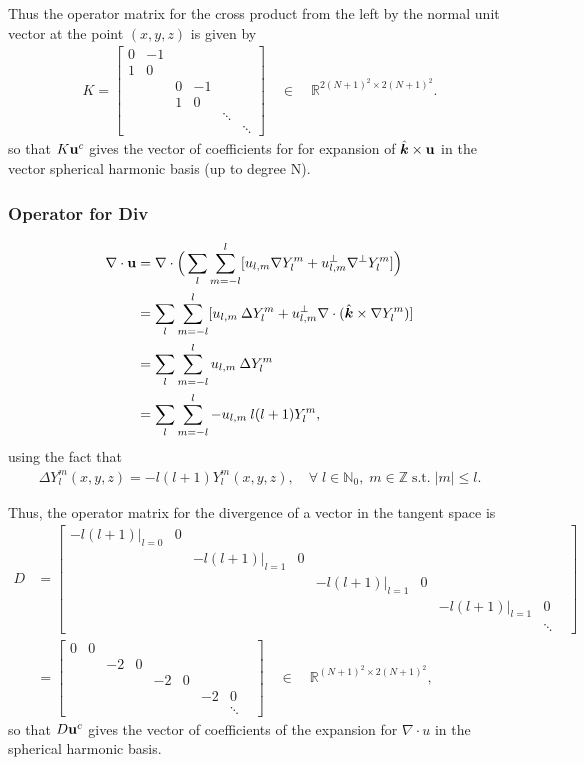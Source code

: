 \documentclass[11pt, oneside]{article}   	%
\newcommand{\R}{\mathbb{R}}
\newcommand{\Z}{\mathbb{Z}}
\newcommand{\No}{\mathbb{N}_0}
\newcommand{\Ylm}{Y^m_l}
\newcommand{\gradYlm}{\nabla Y^m_l}
\newcommand{\gradpYlm}{\nabla^\perp Y^m_l}
\newcommand{\unitvec}{\hat{\bm{k}}}
\begin{document}
Thus the operator matrix for the cross product from the left by the normal unit vector at the point \((x,y,z)\) is given by
\begin{align}
K =  \begin{bmatrix}
		0 & -1 & & & & \\
		1 & 0 & & & & \\
		& & 0 & -1 & & \\
		& & 1 & 0 & & \\
		& & & & \ddots \\
		& & & & & \ddots 
	  \end{bmatrix} \quad \in \quad \R^{2(N+1)^2 \times 2(N+1)^2}.
\end{align}
so that \(K\bold{u}^c\) gives the vector of coefficients for for expansion of \(\unitvec \times \bold{u}\) in the vector spherical harmonic basis (up to degree N).


\subsubsection{Operator for Div}
\begin{align}
\nabla \cdot \bold{u} &= \nabla \cdot \Big( \sum_l \sum_{m=-l}^{l} [ u_{l,m} \gradYlm + u^{\perp}_{l,m} \gradpYlm ] \Big) \\
&= \sum_l \sum_{m=-l}^{l} [ u_{l,m} \: \Delta \Ylm + u^{\perp}_{l,m} \nabla \cdot (\unitvec \times \gradYlm) ] \\
&= \sum_l \sum_{m=-l}^{l} u_{l,m} \: \Delta \Ylm \\
&= \sum_l \sum_{m=-l}^{l} - u_{l,m} \: l(l+1) \Ylm, \\
\end{align}
using the fact that 
\begin{align}
\Delta \Ylm(x,y,z) = -l(l+1)\Ylm(x,y,z), \quad \forall \; l \in \No, \; m \in \Z \; \text{s.t.} \; |m| \le l.
\end{align}

Thus, the operator matrix for the divergence of a vector in the tangent space is
\begin{align}
D &=  \begin{bmatrix}
		-l(l+1)|_{l=0} & 0 & & & & & & & \\
		& & -l(l+1)|_{l=1} & 0 & & & & & \\
		& & & & -l(l+1)|_{l=1} & 0 & & & \\
		& & & & & & -l(l+1)|_{l=1} & 0 & \\
		& & & & & & & \ddots 
	  \end{bmatrix} \\
	  &=  \begin{bmatrix}
		0 & 0 & & & & & & & \\
		& & -2 & 0 & & & & & \\
		& & & & -2 & 0 & & & \\
		& & & & & & -2 & 0 & \\
		& & & & & & & \ddots 
	  \end{bmatrix} \quad \in \quad \R^{(N+1)^2 \times 2(N+1)^2},
\end{align}
so that \(D\bold{u}^c\) gives the vector of coefficients of the expansion for \(\nabla \cdot u\) in the spherical harmonic basis.
\end{document}
